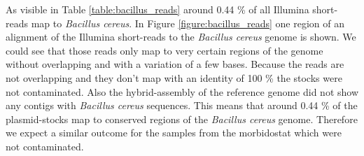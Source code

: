 As visible in Table \ref{table:bacillus_reads} around 0.44 \% of all Illumina short-reads map to \textit{Bacillus cereus}. In Figure \ref{figure:bacillus_reads} one region of an alignment of the Illumina short-reads to the \textit{Bacillus cereus} genome is shown. We could see that those reads only map to very certain regions of the genome without overlapping and with a variation of a few bases. Because the reads are not overlapping and they don't map with an identity of 100 \% the stocks were not contaminated. Also the hybrid-assembly of the reference genome did not show any contigs with \textit{Bacillus cereus} sequences.
This means that around 0.44 \% of the plasmid-stocks map to conserved regions of the \textit{Bacillus cereus} genome. Therefore we expect a similar outcome for the samples from the morbidostat which were not contaminated. 

